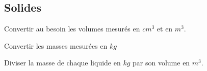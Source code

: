 \documentclass[a4paper,11pt]{exam}
\begin{document}
\subsection{Solides}

		\begin{questions}
		\question Convertir au besoin les volumes mesurés en $cm^3$ et en $m^3$.
		
		\fillwithdottedlines{1cm}
		
		\question Convertir les masses mesurées en $kg$
		
		\fillwithdottedlines{2cm}
		
		\question Diviser la masse de chaque liquide en $kg$ par son volume en $m^3$.
		
		\fillwithdottedlines{2cm}
		
	\end{questions}
\ \label{LastPage}
\end{document}
